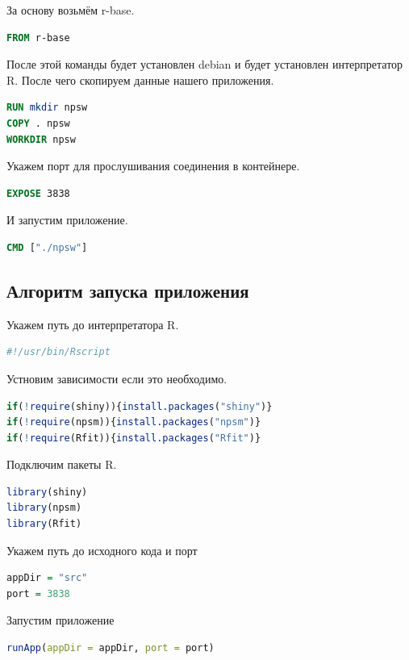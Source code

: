 \documentclass[14pt,a4paper]{scrartcl}
\begin{document}
    За основу возьмём r-base.
    \begin{lstlisting}[language=Dockerfile]
FROM r-base
    \end{lstlisting}
    После этой команды будет установлен debian и будет установлен интерпретатор R. После чего скопируем данные нашего приложения.
    \begin{lstlisting}[language=Dockerfile]
RUN mkdir npsw
COPY . npsw
WORKDIR npsw
    \end{lstlisting}
    Укажем порт для прослушивания соединения в контейнере.
    \begin{lstlisting}[language=Dockerfile]
EXPOSE 3838
    \end{lstlisting}
    И запустим приложение.
    \begin{lstlisting}[language=Dockerfile]
CMD ["./npsw"]
    \end{lstlisting}

    \subsection[Алгоритм запуска приложения]{Алгоритм запуска приложения}
    Укажем путь до интерпретатора R.
    \begin{lstlisting}[language=R]
#!/usr/bin/Rscript
    \end{lstlisting}

    Устновим зависимости если это необходимо.
    \begin{lstlisting}[language=R]
if(!require(shiny)){install.packages("shiny")}
if(!require(npsm)){install.packages("npsm")}
if(!require(Rfit)){install.packages("Rfit")}
    \end{lstlisting}

    Подключим пакеты R.
    \begin{lstlisting}[language=R]
library(shiny)
library(npsm)
library(Rfit)
    \end{lstlisting}

    Укажем путь до исходного кода и порт
    \begin{lstlisting}[language=R]
appDir = "src"
port = 3838
    \end{lstlisting}

    Запустим приложение
    \begin{lstlisting}[language=R]
runApp(appDir = appDir, port = port)
    \end{lstlisting}
\end{document}
